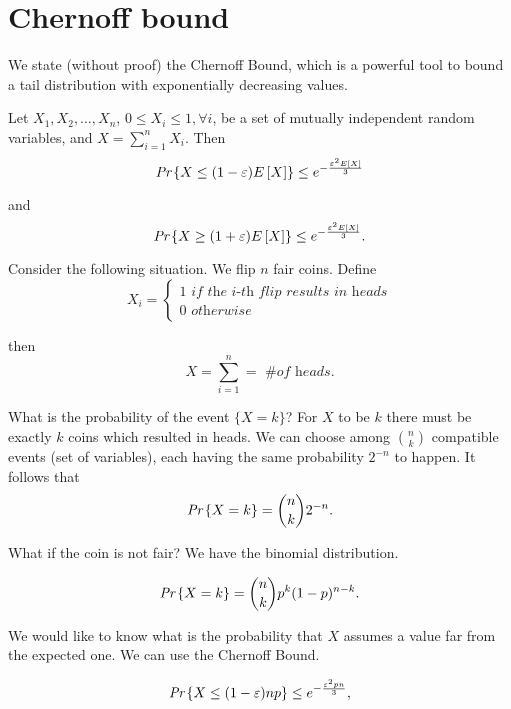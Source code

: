 \section{Chernoff bound}

We state (without proof) the Chernoff Bound, which is a powerful tool to bound a tail distribution with exponentially decreasing values.
\begin{thm}
	Let $X_1, X_2, \ldots, X_n$, $0 \leq X_i \leq 1,\forall i$, be a set of mutually independent random variables, and $X = \sum_{i=1}^nX_i$. Then
	\begin{equation}
	\emph{Pr}\left\{X \leq (1-\varepsilon)E\left[X\right]\right\} \leq e^{-\frac{\varepsilon^2E\left[X\right]}{3}}
	\end{equation}
	
	and
	\begin{equation}
	\emph{Pr}\left\{X \geq (1+\varepsilon)E\left[X\right]\right\} \leq e^{-\frac{\varepsilon^2E\left[X\right]}{3}}.
	\end{equation}
\end{thm}

Consider the following situation. We flip $n$ fair coins. Define
\[X_i = \begin{cases}1 \textit{ if the i-th flip results in heads}\\0 \textit{ otherwise}\end{cases}\]

then 
\[X = \sum_{i=1}^n = \textit{ \# of heads}.\] 

What is the probability of the event $\{X = k\}$? For $X$ to be $k$ there must be exactly $k$ coins which resulted in heads. We can choose among $\binom{n}{k}$ compatible events (set of variables), each having the same probability $2^{-n}$ to happen. It follows that
\begin{equation*}
	\emph{Pr}\left\{X = k\right\} = \binom{n}{k}2^{-n}.
\end{equation*} 

What if the coin is not fair? We have the binomial distribution.

\begin{equation}
	\emph{Pr}\left\{X = k\right\} = \binom{n}{k} p^k(1-p)^{n-k}.
\end{equation}

We would like to know what is the probability that $X$ assumes a value far from the expected one. We can use the Chernoff Bound.

\begin{equation}
	\emph{Pr}\left\{X \leq (1-\varepsilon)np\right\} \leq e^{-\frac{\varepsilon^2pn}{3}},
\end{equation}

